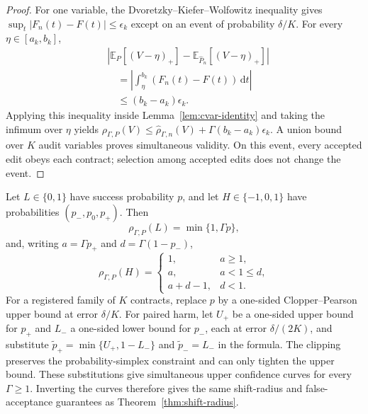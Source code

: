 \begin{proof}
For one variable, the Dvoretzky--Kiefer--Wolfowitz inequality gives
$\sup_t|F_n(t)-F(t)|\leq\epsilon_k$ except on an event of probability
$\delta/K$.  For every $\eta\in[a_k,b_k]$,
\begin{align}
 &\left|\mathbb{E}_P[(V-\eta)_+]
 -\mathbb{E}_{\widehat P_n}[(V-\eta)_+]\right| \nonumber\\
 &\quad=\left|\int_{\eta}^{b_k}(F_n(t)-F(t))\,\mathrm{d}t\right| \nonumber\\
 &\quad\leq(b_k-a_k)\epsilon_k.
\end{align}
Applying this inequality inside Lemma~\ref{lem:cvar-identity} and taking the
infimum over $\eta$ yields
$\rho_{\Gamma,P}(V)\leq\widehat\rho_{\Gamma,n}(V)
+\Gamma(b_k-a_k)\epsilon_k$.  A union bound over $K$ audit variables proves
simultaneous validity.  On this event, every accepted edit obeys each contract;
selection among accepted edits does not change the event.
\end{proof}

\begin{corollary}
\label{cor:exact-discrete}
Let $L\in\{0,1\}$ have success probability $p$, and let
$H\in\{-1,0,1\}$ have probabilities $(p_-,p_0,p_+)$. Then
\begin{equation}
 \rho_{\Gamma,P}(L)=\min\{1,\Gamma p\},
\end{equation}
and, writing $a=\Gamma p_+$ and $d=\Gamma(1-p_-)$,
\begin{equation}
 \rho_{\Gamma,P}(H)=
 \begin{cases}
  1, & a\geq1,\\
  a, & a<1\leq d,\\
  a+d-1, & d<1.
 \end{cases}
\end{equation}
For a registered family of $K$ contracts, replace $p$ by a one-sided
Clopper--Pearson upper bound at error $\delta/K$. For paired harm, let
$U_+$ be a one-sided upper bound for $p_+$ and $L_-$ a one-sided lower bound
for $p_-$, each at error $\delta/(2K)$, and substitute
$\widetilde p_+=\min\{U_+,1-L_-\}$ and $\widetilde p_-=L_-$ in the formula.
The clipping preserves the probability-simplex constraint and can only tighten
the upper bound. These substitutions give simultaneous upper confidence curves
for every $\Gamma\geq1$. Inverting the curves therefore gives the same
shift-radius and false-acceptance guarantees as
Theorem~\ref{thm:shift-radius}.
\end{corollary}

